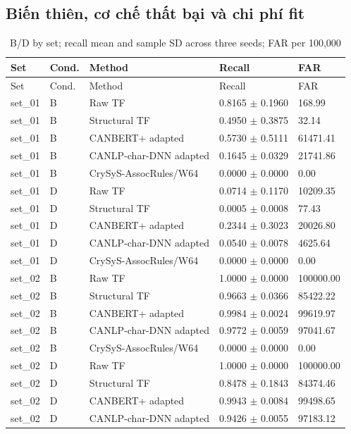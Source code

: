 \documentclass[12pt,a4paper,oneside,openany]{extbook}
\begin{document}
\subsection{Biến thiên, cơ chế thất bại và chi phí fit}
\begin{longtable}{P{1.6cm}P{1.2cm}P{4.0cm}P{3.5cm}P{2.2cm}}
\caption{B/D by set; recall mean and sample SD across three seeds; FAR per 100,000}\label{tab:comparison-sets}\\\toprule
Set & Cond. & Method & Recall & FAR\\\midrule\endfirsthead
\toprule
Set & Cond. & Method & Recall & FAR\\\midrule\endhead
set\_01 & B & Raw TF & 0.8165 $\pm$ 0.1960 & 168.99\\
set\_01 & B & Structural TF & 0.4950 $\pm$ 0.3875 & 32.14\\
set\_01 & B & CANBERT+ adapted & 0.5730 $\pm$ 0.5111 & 61471.41\\
set\_01 & B & CANLP-char-DNN adapted & 0.1645 $\pm$ 0.0329 & 21741.86\\
set\_01 & B & CrySyS-AssocRules/W64 & 0.0000 $\pm$ 0.0000 & 0.00\\
set\_01 & D & Raw TF & 0.0714 $\pm$ 0.1170 & 10209.35\\
set\_01 & D & Structural TF & 0.0005 $\pm$ 0.0008 & 77.43\\
set\_01 & D & CANBERT+ adapted & 0.2344 $\pm$ 0.3023 & 20026.80\\
set\_01 & D & CANLP-char-DNN adapted & 0.0540 $\pm$ 0.0078 & 4625.64\\
set\_01 & D & CrySyS-AssocRules/W64 & 0.0000 $\pm$ 0.0000 & 0.00\\
set\_02 & B & Raw TF & 1.0000 $\pm$ 0.0000 & 100000.00\\
set\_02 & B & Structural TF & 0.9663 $\pm$ 0.0366 & 85422.22\\
set\_02 & B & CANBERT+ adapted & 0.9984 $\pm$ 0.0024 & 99619.97\\
set\_02 & B & CANLP-char-DNN adapted & 0.9772 $\pm$ 0.0059 & 97041.67\\
set\_02 & B & CrySyS-AssocRules/W64 & 0.0000 $\pm$ 0.0000 & 0.00\\
set\_02 & D & Raw TF & 1.0000 $\pm$ 0.0000 & 100000.00\\
set\_02 & D & Structural TF & 0.8478 $\pm$ 0.1843 & 84374.46\\
set\_02 & D & CANBERT+ adapted & 0.9943 $\pm$ 0.0084 & 99498.65\\
set\_02 & D & CANLP-char-DNN adapted & 0.9426 $\pm$ 0.0055 & 97183.12\\

\end{longtable}
\end{document}
